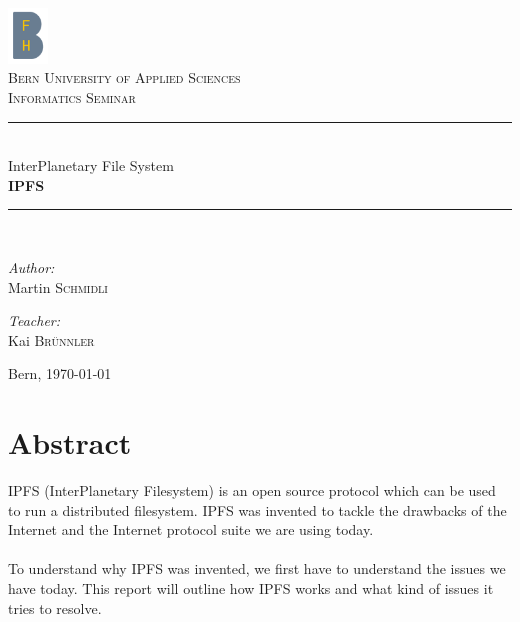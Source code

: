 \documentclass[a4paper,11pt, oneside]{report}
\theoremstyle{definition}
\begin{document}
\pagestyle{empty} %
\begin{titlepage}
\begin{center}

\includegraphics[width=0.08\textwidth]{img/bfh_logo.png}\\[1cm]    
\textsc{\LARGE Bern University of Applied Sciences}\\[1.5cm]
\textsc{\Large Informatics Seminar}\\[0.5cm]

\newcommand{\HRule}{\rule{\linewidth}{0.3mm}}
\HRule \\[0.4cm]
{\huge InterPlanetary File System}\\[0.3cm]
{\huge \bfseries  IPFS}
\HRule \\[1.5cm]

\begin{minipage}{0.4\textwidth}
\begin{flushleft} \large
\emph{Author:}\\
Martin \textsc{Schmidli}\\
\end{flushleft}
\end{minipage}
\hfill
\begin{minipage}{0.4\textwidth}
\begin{flushright} \large
\emph{Teacher:} \\
Kai \textsc{Brünnler}
\end{flushright}
\end{minipage}
\vfill


Bern, {\large \today}
\end{center}
\end{titlepage}
\pagestyle{fancy}

\tableofcontents


\chapter{Abstract}
IPFS (InterPlanetary Filesystem) is an open source protocol which can be used to run a distributed filesystem. IPFS was invented to tackle the drawbacks of the Internet and the Internet protocol suite we are using today.\\ \\
To understand why IPFS was invented, we first have to understand the issues we have today. This report will outline how IPFS works and what kind of issues it tries to resolve.
\end{document}
